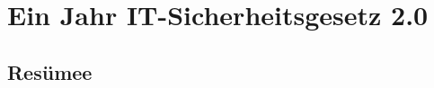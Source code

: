 \chapter{Ein Jahr IT-Sicherheitsgesetz 2.0}\label{ch:ein-jahr-it-sicherheitsgesetz-2.0}

\section{Resümee}\label{sec:resumee}
